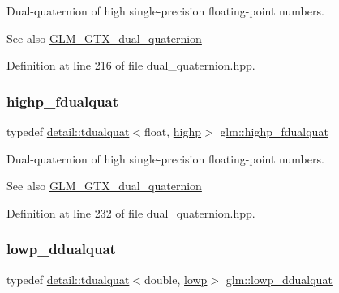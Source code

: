 Dual-\/quaternion of high single-\/precision floating-\/point numbers.

\begin{DoxySeeAlso}{See also}
\hyperlink{group__gtc__dual__quaternion}{G\+L\+M\+\_\+\+G\+T\+X\+\_\+dual\+\_\+quaternion} 
\end{DoxySeeAlso}


Definition at line 216 of file dual\+\_\+quaternion.\+hpp.

\mbox{\label{group__gtc__dual__quaternion_ga2ed3283c09d3ffaf52a0e0a4b248eab6}} 
\subsubsection{\texorpdfstring{highp\+\_\+fdualquat}{highp\_fdualquat}}
{\footnotesize\ttfamily typedef \hyperlink{structglm_1_1detail_1_1tdualquat}{detail\+::tdualquat}$<$float, \hyperlink{namespaceglm_a0f04f086094c747d227af4425893f545ac6f7eab42eacbb10d59a58e95e362074}{highp}$>$ \hyperlink{group__gtc__dual__quaternion_ga2ed3283c09d3ffaf52a0e0a4b248eab6}{glm\+::highp\+\_\+fdualquat}}

Dual-\/quaternion of high single-\/precision floating-\/point numbers.

\begin{DoxySeeAlso}{See also}
\hyperlink{group__gtc__dual__quaternion}{G\+L\+M\+\_\+\+G\+T\+X\+\_\+dual\+\_\+quaternion} 
\end{DoxySeeAlso}


Definition at line 232 of file dual\+\_\+quaternion.\+hpp.

\mbox{\label{group__gtc__dual__quaternion_ga29461fddd543ffdf65a199fc28c42458}} 
\subsubsection{\texorpdfstring{lowp\+\_\+ddualquat}{lowp\_ddualquat}}
{\footnotesize\ttfamily typedef \hyperlink{structglm_1_1detail_1_1tdualquat}{detail\+::tdualquat}$<$double, \hyperlink{namespaceglm_a0f04f086094c747d227af4425893f545ae161af3fc695e696ce3bf69f7332bc2d}{lowp}$>$ \hyperlink{group__gtc__dual__quaternion_ga29461fddd543ffdf65a199fc28c42458}{glm\+::lowp\+\_\+ddualquat}}

